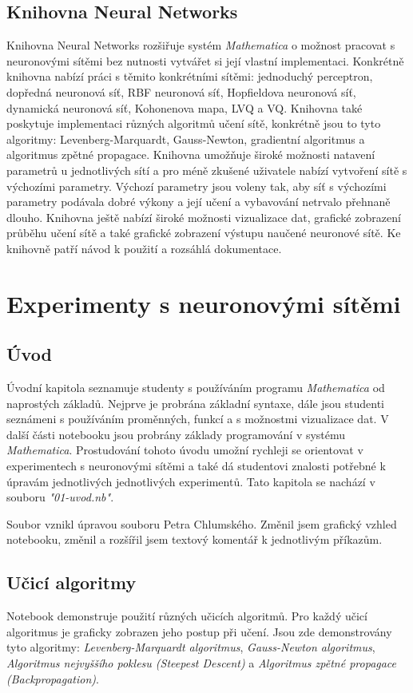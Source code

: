 \documentclass[11pt,twoside,a4paper]{book}
\begin{document}
\section{Knihovna Neural Networks}
Knihovna Neural Networks rozšiřuje systém \textit{Mathematica} o možnost pracovat s neuronovými sítěmi bez nutnosti vytvářet si její vlastní implementaci. Konkrétně knihovna nabízí práci s těmito konkrétními sítěmi: jednoduchý perceptron, dopředná neuronová síť, RBF neuronová síť, Hopfieldova neuronová síť, dynamická neuronová síť, Kohonenova mapa, LVQ a VQ. Knihovna také poskytuje implementaci různých algoritmů učení sítě, konkrétně jsou to tyto algoritmy: Levenberg-Marquardt, Gauss-Newton, gradientní algoritmus a algoritmus zpětné propagace. Knihovna umožňuje široké možnosti natavení parametrů u jednotlivých sítí a pro méně zkušené uživatele nabízí vytvoření sítě s výchozími parametry. Výchozí parametry jsou voleny tak, aby síť s výchozími parametry podávala dobré výkony a její učení a vybavování netrvalo přehnaně dlouho. Knihovna ještě nabízí široké možnosti vizualizace dat, grafické zobrazení průběhu učení sítě a také grafické zobrazení výstupu naučené neuronové sítě. Ke knihovně patří návod k použití a rozsáhlá dokumentace.
\chapter{Experimenty s neuronovými sítěmi}
\section{Úvod}
Úvodní kapitola seznamuje studenty s používáním programu \textit{Mathematica} od naprostých základů. Nejprve je probrána základní syntaxe, dále jsou studenti seznámeni s používáním proměnných, funkcí a s možnostmi vizualizace dat. V další části notebooku jsou probrány základy programování v systému \textit{Mathematica}. Prostudování tohoto úvodu umožní rychleji se orientovat v experimentech s neuronovými sítěmi a také dá studentovi znalosti potřebné k úpravám jednotlivých jednotlivých experimentů. Tato kapitola se nachází v souboru \textit{"01-uvod.nb"}.

Soubor vznikl úpravou souboru Petra Chlumského. Změnil jsem grafický vzhled notebooku, změnil a rozšířil jsem textový komentář k jednotlivým příkazům.
\section{Učicí algoritmy}
Notebook demonstruje použití různých učicích algoritmů. Pro každý učicí algoritmus je graficky zobrazen jeho postup při učení. Jsou zde demonstrovány tyto algoritmy: \textit{Levenberg-Marquardt algoritmus}, \textit{Gauss-Newton algoritmus}, \textit{Algoritmus nejvyššího poklesu (Steepest Descent)} a \textit{Algoritmus zpětné propagace (Backpropagation)}.
\end{document}
